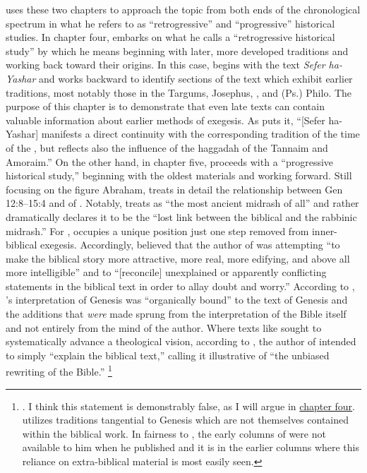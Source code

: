 \vermes uses these two chapters to approach the topic from both ends of the chronological spectrum in what he refers to as ``retrogressive'' and ``progressive'' historical studies. In chapter four, \vermes embarks on what he calls a ``retrogressive historical study'' by which he means beginning with later, more developed traditions and working back toward their origins. In this case, \vermes begins with the  text \emph{Sefer ha-Yashar} and works backward to identify sections of the text which exhibit earlier traditions, most notably those in the Targums, Josephus, \jub, and (Ps.) Philo. The purpose of this chapter is to demonstrate that even late texts can contain valuable information about earlier methods of exegesis. As \vermes puts it, ``[Sefer ha-Yashar] manifests a direct continuity with the corresponding tradition of the time of the \secondtemple, but reflects also the influence of the haggadah of the Tannaim and Amoraim.''%
    \autocite[95]{vermes1961}
On the other hand, in chapter five, \vermes proceeds with a ``progressive historical study,'' beginning with the oldest materials and working forward. Still focusing on the figure Abraham, \vermes treats in detail the relationship between Gen 12:8--15:4 and  of \ga. Notably, \vermes treats \ga as ``the most ancient midrash of all''%
    \autocite[124]{vermes1961}
and rather dramatically declares it to be the ``lost link between the biblical and the rabbinic midrash.''%
    \autocite[124]{vermes1961}
For \vermes, \ga occupies a unique position just one step removed from inner-biblical exegesis. Accordingly, \vermes believed that the author of \ga was attempting ``to make the biblical story more attractive, more real, more edifying, and above all more intelligible'' and to ``[reconcile] unexplained or apparently conflicting statements in the biblical text in order to allay doubt and worry.''%
    \autocite[126]{vermes1961}
According to \vermes, \ga's interpretation of Genesis was ``organically bound'' to the text of Genesis and the additions that \emph{were} made sprung from the interpretation of the Bible itself and not entirely from the mind of the author. Where texts like \jub sought to systematically advance a theological vision, according to \vermes, the author of \ga intended to simply ``explain the biblical text,'' calling it illustrative of ``the unbiased rewriting of the Bible.''%
    \footnote{%
        \Cite[126]{vermes1961}. I think this statement is demonstrably false, as I will argue in \hyperref[chap:ga]{chapter four}. \GA utilizes traditions tangential to Genesis which are not themselves contained within the biblical work. In fairness to \vermes, the early columns of \ga were not available to him when he published  and it is in the earlier columns where this reliance on extra-biblical material is most easily seen.}

